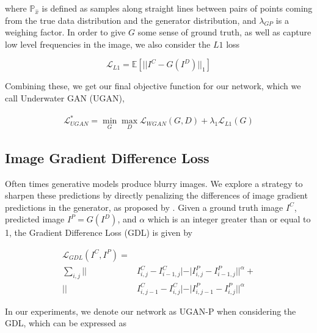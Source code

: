 \noindent where $\mathbb{P}_{\hat{x}}$ is defined as samples along straight lines between pairs of points coming from
the true data distribution and the generator distribution, and $\lambda_{GP}$ is a weighing factor. In order to give $G$
some sense of ground truth, as well as capture low level frequencies in the image, we also consider the $L1$ loss

\begin{equation}
   \mathcal{L}_{L1} = \mathbb{E} [ || I^C - G(I^D) ||_1 ]
\end{equation}

\noindent Combining these, we get our final objective function for our network, which we call Underwater GAN (UGAN),

\begin{equation}
   \begin{aligned}
      \mathcal{L}_{UGAN}^* = \min\limits_{G}\max\limits_{D} \mathcal{L}_{WGAN}(G,D) + \lambda_{1} \mathcal{L}_{L1}(G)
   \end{aligned}
\end{equation}


\subsection{Image Gradient Difference Loss}
Often times generative models produce blurry images. We explore a strategy to sharpen these predictions by
directly penalizing the differences of image gradient predictions in the generator, as proposed by
\cite{mathieu2015deep}. Given a ground truth image $I^C$, predicted image $I^P = G(I^D)$, and $\alpha$ which is an integer 
greater than or equal to 1, the Gradient Difference Loss (GDL) is given by

\begin{equation}
   \begin{aligned}
      \mathcal{L}_{GDL}(I^C, I^P) = \\ \sum\limits_{i,j} || & I^C_{i,j} - I^C_{i-1,j}| - | I^P_{i,j} - I^P_{i-1,j}||^{\alpha} + \\
      || & I^C_{i,j-1} - I^C_{i,j}| - | I^P_{i,j-1} - I^P_{i,j}||^{\alpha}
   \end{aligned}
   \label{gdl_eq}
\end{equation}

\noindent In our experiments, we denote our network as UGAN-P when considering the GDL, which can be expressed as

